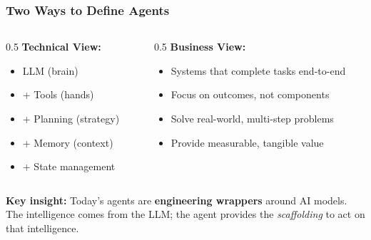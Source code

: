 \begin{frame}[fragile]\frametitle{Two Ways to Define Agents}
\begin{columns}
    \begin{column}[T]{0.5\linewidth}
        \textbf{Technical View:}
        \begin{itemize}
            \item LLM (brain)
            \item + Tools (hands)
            \item + Planning (strategy)
            \item + Memory (context)
            \item + State management
        \end{itemize}
    \end{column}
    \begin{column}[T]{0.5\linewidth}
        \textbf{Business View:}
        \begin{itemize}
            \item Systems that complete tasks end-to-end
            \item Focus on outcomes, not components
            \item Solve real-world, multi-step problems
            \item Provide measurable, tangible value
        \end{itemize}
    \end{column}
\end{columns}
\vspace{0.5cm}
\textbf{Key insight:} Today's agents are \textbf{engineering wrappers} around AI models.  The intelligence comes from the LLM; the agent provides the \emph{scaffolding} to act on that intelligence.
\end{frame}

